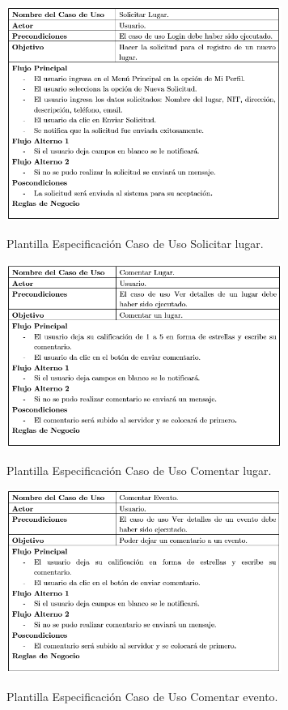 \documentclass[12pt,letterpaper,openany]{book}
\begin{document}
\begin{table}[H]
\centering
\includegraphics[width=9cm]{./imagenes/PCU/solicitar_lugar}
\caption{Plantilla Especificación Caso de Uso Solicitar lugar.}
\end{table}

\begin{table}[H]
\centering
\includegraphics[width=9cm]{./imagenes/PCU/comentar_lugar}
\caption{Plantilla Especificación Caso de Uso Comentar lugar.}
\end{table}

\begin{table}[H]
\centering
\includegraphics[width=9cm]{./imagenes/PCU/comentar_evento}
\caption{Plantilla Especificación Caso de Uso Comentar evento.}
\end{table}
\end{document}
